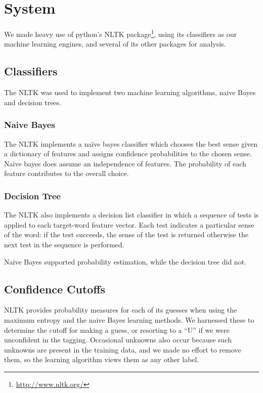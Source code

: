 \documentclass{article}
\begin{document}
\section{System}

We made heavy use of python's NLTK package\footnote{\url{http://www.nltk.org/}}, using its classifiers as our machine learning engines, and several of its other packages for analysis.

\subsection{Classifiers}

The NLTK was used to implement two machine learning algorithms, naive Bayes and decision trees.  

\subsubsection{Naive Bayes}

The NLTK implements a naïve bayes classifier which chooses the best sense given a dictionary of features and assigns confidence probabilities to the chosen sense. Naive bayes does assume an independence of features. The probability of each feature contributes to the overall choice.

\subsubsection{Decision Tree}

The NLTK also implements a decision list classifier in which a sequence of tests is applied to each target-word feature vector. Each test indicates a particular sense of the word: if the test succeeds, the sense of the test is returned otherwise the next test in the sequence is performed.

Naive Bayes supported probability estimation, while the decision tree did not.

\subsection{Confidence Cutoffs}

NLTK provides probability measures for each of its guesses when using the
maximum entropy and the naive Bayes learning methods.  We harnessed these to
determine the cutoff for making a guess, or resorting to a ``U'' if we were unconfident in the tagging.  Occasional unknowns also occur because such unknowns are present in the training data, and we made no effort to remove them, so the learning algorithm views them as any other label.
\end{document}
